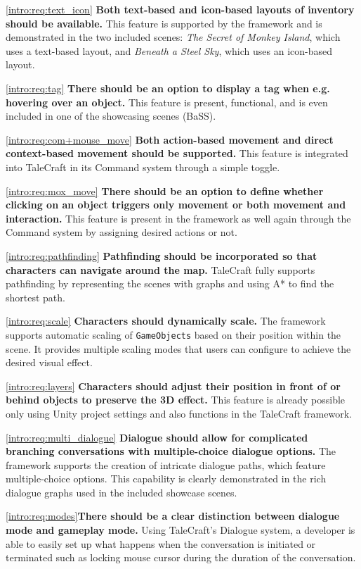 \ref{intro:req:text_icon} \quad  \textbf{Both text-based and icon-based layouts of inventory should be available.} This feature is supported by the framework and is demonstrated in the two included scenes: \textit{The Secret of Monkey Island}, which uses a text-based layout, and \textit{Beneath a Steel Sky}, which uses an icon-based layout. 

\ref{intro:req:tag} \quad  \textbf{There should be an option to display a tag when e.g. hovering over an object.} This feature is present, functional, and is even included in one of the showcasing scenes (BaSS).

\ref{intro:req:com+mouse_move} \quad  \textbf{Both action-based movement and direct context-based movement should be supported.} This feature is integrated into TaleCraft in its Command system through a simple toggle.

\ref{intro:req:mox_move} \quad  \textbf{There should be an option to define whether clicking on an object triggers only movement or both movement and interaction.} This feature is present in the framework as well again through the Command system by assigning desired actions or not.

\ref{intro:req:pathfinding} \quad  \textbf{Pathfinding should be incorporated so that characters can navigate around the map.} TaleCraft fully supports pathfinding by representing the scenes with graphs and using A* to find the shortest path.

\ref{intro:req:scale} \quad  \textbf{Characters should dynamically scale.} The framework supports automatic scaling of \verb|GameObjects| based on their position within the scene. It provides multiple scaling modes that users can configure to achieve the desired visual effect.
 
\ref{intro:req:layers} \quad  \textbf{Characters should adjust their position in front of or behind objects to preserve the 3D effect.} This feature is already possible only using Unity project settings and also functions in the TaleCraft framework.

\ref{intro:req:multi_dialogue} \quad  \textbf{Dialogue should allow for complicated branching conversations with multiple-choice dialogue options.} The framework supports the creation of intricate dialogue paths, which feature multiple-choice options. This capability is clearly demonstrated in the rich dialogue graphs used in the included showcase scenes. 

\ref{intro:req:modes}\quad  \textbf{There should be a clear distinction between dialogue mode and gameplay mode.} Using TaleCraft's Dialogue system, a developer is able to easily set up what happens when the conversation is initiated or terminated such as locking mouse cursor during the duration of the conversation.

